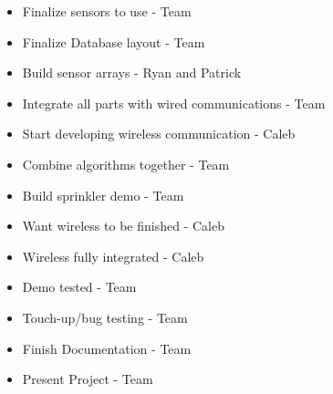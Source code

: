 \documentclass[letterpaper, 10 pt, conference]{ieeeconf}  %
\begin{document}
\begin{itemize}
    \item Finalize sensors to use - Team
    \item Finalize Database layout - Team
    \item Build sensor arrays - Ryan and Patrick
    \item Integrate all parts with wired communications - Team
    \item Start developing wireless communication - Caleb
\end{itemize}

\begin{itemize}
    \item Combine algorithms together - Team
    \item Build sprinkler demo - Team
    \item Want wireless to be finished - Caleb
\end{itemize}

\begin{itemize}
    \item Wireless fully integrated - Caleb
    \item Demo tested - Team
    \item Touch-up/bug testing - Team
    \item Finish Documentation - Team
\end{itemize}

\begin{itemize}
    \item Present Project - Team
\end{itemize}
\end{document}
